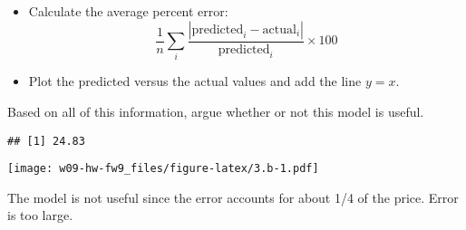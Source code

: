\documentclass[
]{article}
\newenvironment{Shaded}{\begin{snugshade}}{\end{snugshade}}
\newcommand{\AttributeTok}[1]{\textcolor[rgb]{0.77,0.63,0.00}{#1}}
\newcommand{\DecValTok}[1]{\textcolor[rgb]{0.00,0.00,0.81}{#1}}
\newcommand{\FunctionTok}[1]{\textcolor[rgb]{0.00,0.00,0.00}{#1}}
\newcommand{\NormalTok}[1]{#1}
\newcommand{\OtherTok}[1]{\textcolor[rgb]{0.56,0.35,0.01}{#1}}
\newcommand{\SpecialCharTok}[1]{\textcolor[rgb]{0.00,0.00,0.00}{#1}}
\newcommand{\StringTok}[1]{\textcolor[rgb]{0.31,0.60,0.02}{#1}}
\providecommand{\tightlist}{%
  \setlength{\itemsep}{0pt}\setlength{\parskip}{0pt}}
\begin{document}
\begin{itemize}
\tightlist
\item
  Calculate the average percent error: \[
  \frac{1}{n}\sum_i\frac{|\text{predicted}_i - \text{actual}_i|}{\text{predicted}_i} \times 100
  \]
\item
  Plot the predicted versus the actual values and add the line
  \(y = x\).
\end{itemize}

Based on all of this information, argue whether or not this model is
useful.

\begin{Shaded}
\end{Shaded}

\begin{verbatim}
## [1] 24.83
\end{verbatim}

\begin{Shaded}
\end{Shaded}

\texttt{[image: w09-hw-fw9\_files/figure-latex/3.b-1.pdf]}

The model is not useful since the error accounts for about 1/4 of the
price. Error is too large.
\end{document}
